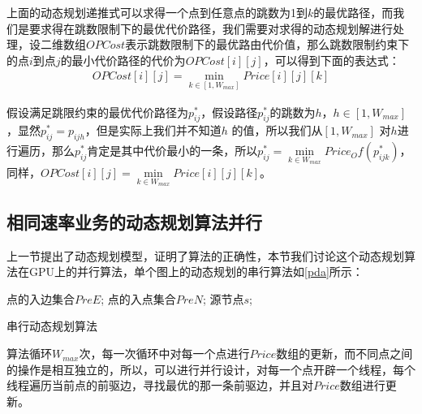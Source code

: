 上面的动态规划递推式可以求得一个点到任意点的跳数为1到$k$的最优路径，而我们是要求得在跳数限制下的最优代价路径，我们需要对求得的动态规划解进行处理，设二维数组$OPCost$表示跳数限制下的最优路由代价值，那么跳数限制约束下的点$i$到点$j$的最小代价路径的代价为$OPCost[i][j]$，可以得到下面的表达式：
\begin{equation}\label{best}
\begin{split}
OPCost[i][j]=\min\limits_{k \in [1,W_{max}]}{Price[i][j][k]}
\end{split}
\end{equation}

假设满足跳限约束的最优代价路径为$p_{ij}^*$，假设路径$p_{ij}^*$的跳数为$h$，$h \in [1,W_{max}]$，显然$p_{ij}^*=p_{ijh}$，但是实际上我们并不知道$h$ 的值，所以我们从$[1,W_{max}]$ 对$h$进行遍历，那么$p_{ij}^*$肯定是其中代价最小的一条，所以$p_{ij}^*=\min\limits_{k \in W_{max}}{Price_Of(p_{ijk}^*)}$，同样，$OPCost[i][j]=\min\limits_{k \in W_{max}}{Price[i][j][k]}$。

\subsection{相同速率业务的动态规划算法并行}
上一节提出了动态规划模型，证明了算法的正确性，本节我们讨论这个动态规划算法在GPU上的并行算法，单个图上的动态规划的串行算法如\ref{pda}所示：
\begin{algorithm}[t]
\begin{algorithmic}[1]
\Require
点的入边集合$PreE$;
点的入点集合$PreN$;
源节点$s$;
\EndFor
\EndFor
\end{algorithmic}
\caption{{串行动态规划算法}}
\label{pda}
\end{algorithm}

算法循环$W_{max}$次，每一次循环中对每一个点进行$Price$数组的更新，而不同点之间的操作是相互独立的，所以，可以进行并行设计，对每一个点开辟一个线程，每个线程遍历当前点的前驱边，寻找最优的那一条前驱边，并且对$Price$数组进行更新。

